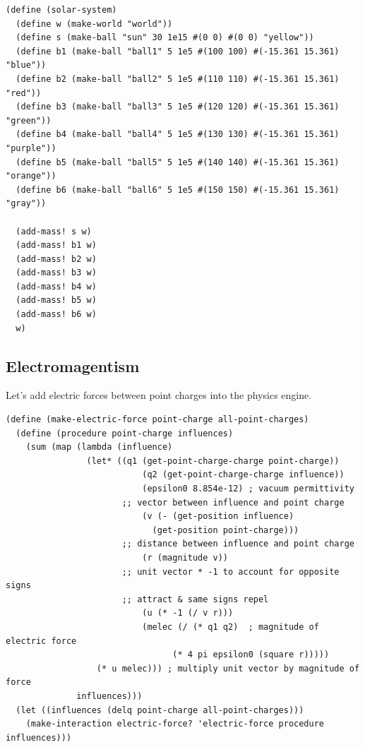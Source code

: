 \documentclass{article}
\begin{document}
{\small\begin{verbatim}
(define (solar-system)
  (define w (make-world "world"))
  (define s (make-ball "sun" 30 1e15 #(0 0) #(0 0) "yellow"))
  (define b1 (make-ball "ball1" 5 1e5 #(100 100) #(-15.361 15.361) "blue"))
  (define b2 (make-ball "ball2" 5 1e5 #(110 110) #(-15.361 15.361) "red"))
  (define b3 (make-ball "ball3" 5 1e5 #(120 120) #(-15.361 15.361) "green"))
  (define b4 (make-ball "ball4" 5 1e5 #(130 130) #(-15.361 15.361) "purple"))
  (define b5 (make-ball "ball5" 5 1e5 #(140 140) #(-15.361 15.361) "orange"))
  (define b6 (make-ball "ball6" 5 1e5 #(150 150) #(-15.361 15.361) "gray"))

  (add-mass! s w)
  (add-mass! b1 w)
  (add-mass! b2 w)
  (add-mass! b3 w)
  (add-mass! b4 w)
  (add-mass! b5 w)
  (add-mass! b6 w)
  w)
\end{verbatim}}

\subsection{Electromagentism}

Let's add electric forces between point charges into the physics engine.

{\small\begin{verbatim}
(define (make-electric-force point-charge all-point-charges)
  (define (procedure point-charge influences)
    (sum (map (lambda (influence)
                (let* ((q1 (get-point-charge-charge point-charge))
            		       (q2 (get-point-charge-charge influence))
            		       (epsilon0 8.854e-12) ; vacuum permittivity
                       ;; vector between influence and point charge
            		       (v (- (get-position influence)
                             (get-position point-charge)))
                       ;; distance between influence and point charge
            		       (r (magnitude v))
                       ;; unit vector * -1 to account for opposite signs
                       ;; attract & same signs repel
            		       (u (* -1 (/ v r)))
            		       (melec (/ (* q1 q2)  ; magnitude of electric force
                                 (* 4 pi epsilon0 (square r)))))
                  (* u melec))) ; multiply unit vector by magnitude of force
              influences)))
  (let ((influences (delq point-charge all-point-charges)))
    (make-interaction electric-force? 'electric-force procedure influences)))
\end{verbatim}}
\end{document}
